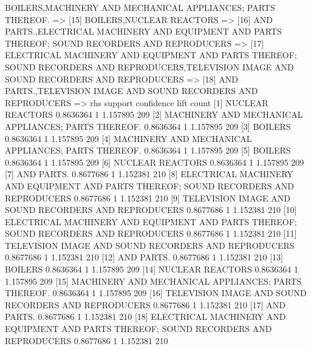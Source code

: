 \documentclass [a4paper] {article}
\begin{document}
{\begin{Schunk}
\begin{Soutput}
[14] {BOILERS,MACHINERY AND MECHANICAL APPLIANCES; PARTS THEREOF.}                                                                                =>
[15] {BOILERS,NUCLEAR REACTORS}                                                                                                                   =>
[16] {AND PARTS.,ELECTRICAL MACHINERY AND EQUIPMENT AND PARTS THEREOF; SOUND RECORDERS AND REPRODUCERS}                                           =>
[17] {ELECTRICAL MACHINERY AND EQUIPMENT AND PARTS THEREOF; SOUND RECORDERS AND REPRODUCERS,TELEVISION IMAGE AND SOUND RECORDERS AND REPRODUCERS} =>
[18] {AND PARTS.,TELEVISION IMAGE AND SOUND RECORDERS AND REPRODUCERS}                                                                            =>
     rhs                                                                                     support   confidence lift     count
[1]  {NUCLEAR REACTORS}                                                                      0.8636364 1          1.157895 209  
[2]  {MACHINERY AND MECHANICAL APPLIANCES; PARTS THEREOF.}                                   0.8636364 1          1.157895 209  
[3]  {BOILERS}                                                                               0.8636364 1          1.157895 209  
[4]  {MACHINERY AND MECHANICAL APPLIANCES; PARTS THEREOF.}                                   0.8636364 1          1.157895 209  
[5]  {BOILERS}                                                                               0.8636364 1          1.157895 209  
[6]  {NUCLEAR REACTORS}                                                                      0.8636364 1          1.157895 209  
[7]  {AND PARTS.}                                                                            0.8677686 1          1.152381 210  
[8]  {ELECTRICAL MACHINERY AND EQUIPMENT AND PARTS THEREOF; SOUND RECORDERS AND REPRODUCERS} 0.8677686 1          1.152381 210  
[9]  {TELEVISION IMAGE AND SOUND RECORDERS AND REPRODUCERS}                                  0.8677686 1          1.152381 210  
[10] {ELECTRICAL MACHINERY AND EQUIPMENT AND PARTS THEREOF; SOUND RECORDERS AND REPRODUCERS} 0.8677686 1          1.152381 210  
[11] {TELEVISION IMAGE AND SOUND RECORDERS AND REPRODUCERS}                                  0.8677686 1          1.152381 210  
[12] {AND PARTS.}                                                                            0.8677686 1          1.152381 210  
[13] {BOILERS}                                                                               0.8636364 1          1.157895 209  
[14] {NUCLEAR REACTORS}                                                                      0.8636364 1          1.157895 209  
[15] {MACHINERY AND MECHANICAL APPLIANCES; PARTS THEREOF.}                                   0.8636364 1          1.157895 209  
[16] {TELEVISION IMAGE AND SOUND RECORDERS AND REPRODUCERS}                                  0.8677686 1          1.152381 210  
[17] {AND PARTS.}                                                                            0.8677686 1          1.152381 210  
[18] {ELECTRICAL MACHINERY AND EQUIPMENT AND PARTS THEREOF; SOUND RECORDERS AND REPRODUCERS} 0.8677686 1          1.152381 210  
\end{Soutput}
\end{Schunk}
}
\end{document}
